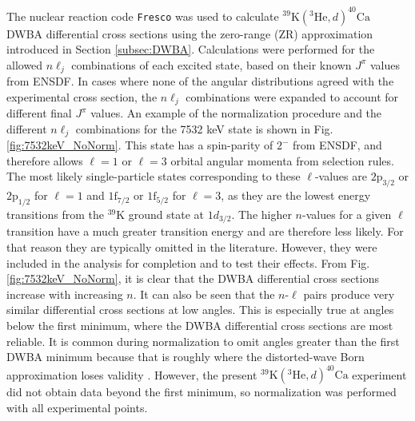 The nuclear reaction code \texttt{Fresco} \cite{Thompson1988,Fresco} was used to calculate $^{39}\mathrm{K}(^{3}\mathrm{He},d)^{40}\mathrm{Ca}$ DWBA differential cross sections using the zero-range (ZR) approximation introduced in Section \ref{subsec:DWBA}. Calculations were performed for the allowed $n\ell_{j}$ combinations of each excited state, based on their known $J^{\pi}$ values from ENSDF. In cases where none of the angular distributions agreed with the experimental cross section, the $n\ell_{j}$ combinations were expanded to account for different final $J^{\pi}$ values. An example of the normalization procedure and the different $n\ell_{j}$ combinations for the 7532 keV state is shown in Fig. \ref{fig:7532keV_NoNorm}. This state has a spin-parity of $2^{-}$ from ENSDF, and therefore allows $\ell=1$ or $\ell=3$ orbital angular momenta from selection rules. The most likely single-particle states corresponding to these $\ell$-values are $2\mathrm{p}_{3/2}$ or $2\mathrm{p}_{1/2}$ for $\ell=1$ and $1\mathrm{f}_{7/2}$ or $1\mathrm{f}_{5/2}$ for $\ell=3$, as they are the lowest energy transitions from the $^{39}$K ground state at $1d_{3/2}$. The higher $n$-values for a given $\ell$ transition have a much greater transition energy and are therefore less likely. For that reason they are typically omitted in the literature. However, they were included in the analysis for completion and to test their effects. From Fig. \ref{fig:7532keV_NoNorm}, it is clear that the DWBA differential cross sections increase with increasing $n$. It can also be seen that the $n$-$\ell$ pairs produce very similar differential cross sections at low angles. This is especially true at angles below the first minimum, where the DWBA differential cross sections are most reliable. It is common during normalization to omit angles greater than the first DWBA minimum because that is roughly where the distorted-wave Born approximation loses validity \cite{??}. However, the present $^{39}\mathrm{K}(^{3}\mathrm{He}, d)^{40}\mathrm{Ca}$ experiment did not obtain data beyond the first minimum, so normalization was performed with all experimental points.

